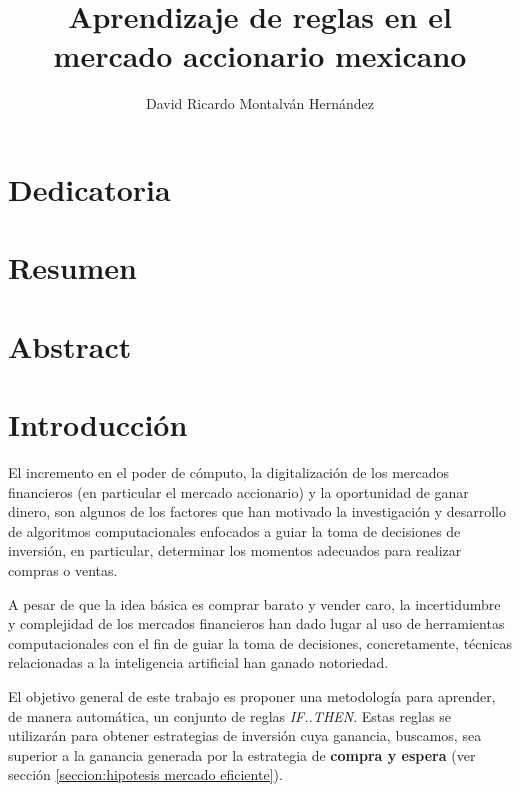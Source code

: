 \documentclass[onesided, 12pt]{scrbook}
\title{Aprendizaje de reglas en el mercado accionario mexicano}
\date{}
\author{David Ricardo Montalván Hernández}
\theoremstyle{break}
\begin{document}
\maketitle
{} %
\renewcommand{\contentsname}{Contenido}
\tableofcontents
\renewcommand{\listfigurename}{Lista de imágenes}
\listoffigures
\renewcommand{\listtablename}{Lista de tablas}
\renewcommand\tablename{Tabla}
\renewcommand{\bibname}{Referencias}
\listoftables

\chapter*{Dedicatoria}
\chapter*{Resumen}
\chapter*{Abstract}


\chapter{Introducción}
\label{capitulo:introduccion}
El incremento en el poder de cómputo, la digitalización de los mercados financieros (en particular el mercado accionario) y la oportunidad de ganar dinero, son algunos de los factores que han motivado la investigación y desarrollo de algoritmos computacionales enfocados a guiar la toma de decisiones de inversión, en particular, determinar los momentos adecuados para realizar compras o ventas.

A pesar de que la idea básica es comprar barato y vender caro, la incertidumbre y complejidad de los mercados financieros han dado lugar al uso de herramientas computacionales con el fin de guiar la toma de decisiones, concretamente, técnicas relacionadas a la inteligencia artificial han ganado notoriedad.

El objetivo general de este trabajo es proponer una metodología para aprender, de manera automática, un conjunto de reglas \textit{IF..THEN}. Estas reglas se utilizarán para obtener estrategias de inversión cuya ganancia, buscamos, sea superior a la ganancia generada por la estrategia de \textbf{compra y espera} (ver sección \ref{seccion:hipotesis mercado eficiente}).
\end{document}
